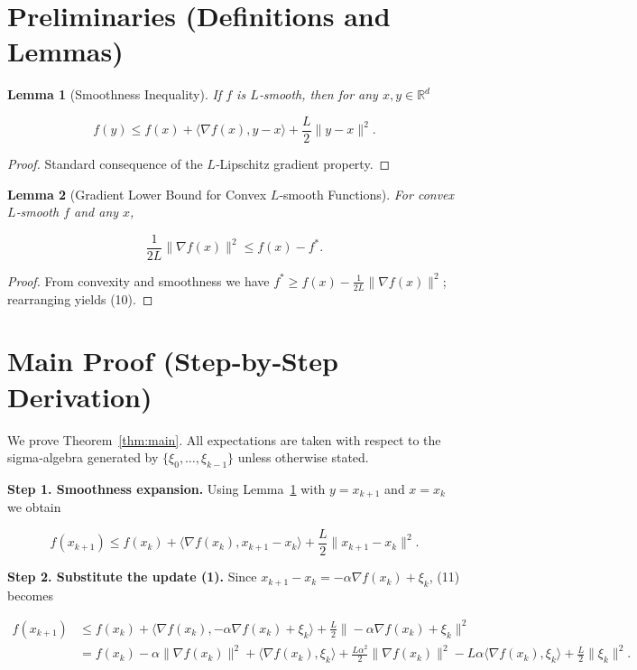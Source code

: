 \documentclass[11pt]{article}
\newtheorem{lemma}{Lemma}
\newcommand{\R}{\mathbb{R}}
\begin{document}
\section*{Preliminaries (Definitions and Lemmas)}
\begin{lemma}[Smoothness Inequality]\label{lem:smooth}
If $f$ is $L$‑smooth, then for any $x,y\in\R^{d}$  

\[
f(y)\le f(x)+\langle\nabla f(x),y-x\rangle+\frac{L}{2}\|y-x\|^{2}.
\tag{9}
\]
\end{lemma}
\begin{proof}
Standard consequence of the $L$‑Lipschitz gradient property. \qedhere
\end{proof}

\begin{lemma}[Gradient Lower Bound for Convex $L$‑smooth Functions]\label{lem:gradlb}
For convex $L$‑smooth $f$ and any $x$,  

\[
\frac{1}{2L}\|\nabla f(x)\|^{2}\le f(x)-f^{*}.
\tag{10}
\]
\end{lemma}
\begin{proof}
From convexity and smoothness we have
$f^{*}\ge f(x)-\frac{1}{2L}\|\nabla f(x)\|^{2}$; rearranging yields (10).\qedhere
\end{proof}

\section*{Main Proof (Step‑by‑Step Derivation)}
We prove Theorem~\ref{thm:main}. All expectations are taken with respect to the
sigma‑algebra generated by $\{ \xi_{0},\dots,\xi_{k-1}\}$ unless otherwise
stated.

\noindent\textbf{Step 1. Smoothness expansion.}  
Using Lemma~\ref{lem:smooth} with $y=x_{k+1}$ and $x=x_{k}$ we obtain  

\[
f(x_{k+1})\le f(x_{k})+\langle\nabla f(x_{k}),x_{k+1}-x_{k}\rangle
+\frac{L}{2}\|x_{k+1}-x_{k}\|^{2}.
\tag{11}
\]

\noindent\textbf{Step 2. Substitute the update (1).}  
Since $x_{k+1}-x_{k}= -\alpha\nabla f(x_{k})+\xi_{k}$, (11) becomes  

\[
\begin{aligned}
f(x_{k+1})
&\le f(x_{k})+\langle\nabla f(x_{k}),-\alpha\nabla f(x_{k})+\xi_{k}\rangle
+\frac{L}{2}\|-\alpha\nabla f(x_{k})+\xi_{k}\|^{2}\\[2mm]
&= f(x_{k})-\alpha\|\nabla f(x_{k})\|^{2}
+\langle\nabla f(x_{k}),\xi_{k}\rangle
+\frac{L\alpha^{2}}{2}\|\nabla f(x_{k})\|^{2}
-\!L\alpha\langle\nabla f(x_{k}),\xi_{k}\rangle
+\frac{L}{2}\|\xi_{k}\|^{2}.
\end{aligned}
\tag{12}
\]
\end{document}
